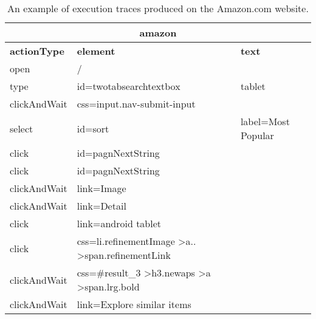 \begin{table}[h]
\begin{tabular}{|l|l|l|}
\hline
\multicolumn{3}{|c|}{\textbf{amazon}}                                                                                       \\ \hline
\textbf{actionType} & \textbf{element}                                                                 & \textbf{text}      \\ \hline
open                & /                                                                                &                    \\ \hline
type                & id=twotabsearchtextbox                                                           & tablet             \\ \hline
clickAndWait        & css=input.nav-submit-input                                                       &                    \\ \hline
select              & id=sort                                                                          & label=Most Popular \\ \hline
click               & id=pagnNextString                                                                &                    \\ \hline
click               & id=pagnNextString                                                                &                    \\ \hline
clickAndWait        & link=Image                                                                       &                    \\ \hline
clickAndWait        & link=Detail                                                                      &                    \\ \hline
click               & link=android tablet                                                              &                    \\ \hline
click               & css=li.refinementImage \textgreater a.. \textgreater span.refinementLink         &                    \\ \hline
clickAndWait        & css=\#result\_3 \textgreater h3.newaps \textgreater a \textgreater span.lrg.bold &                    \\ \hline
clickAndWait        & link=Explore similar items                                                       &                    \\ \hline
\end{tabular}
\caption{An example of execution traces produced on the Amazon.com website.}
\label{tab:amazontraces}
\end{table}

